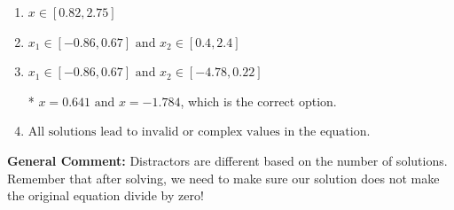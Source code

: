 \documentclass{extbook}[14pt]
\begin{document}
\begin{enumerate}
{\begin{enumerate}[label=\Alph*.]
\item \( x \in [0.82,2.75] \)


\item \( x_1 \in [-0.86, 0.67] \text{ and } x_2 \in [0.4,2.4] \)


\item \( x_1 \in [-0.86, 0.67] \text{ and } x_2 \in [-4.78,0.22] \)

* $x = 0.641 \text{ and } x = -1.784$, which is the correct option.
\item \( \text{All solutions lead to invalid or complex values in the equation.} \)


\end{enumerate}

\textbf{General Comment:} Distractors are different based on the number of solutions. Remember that after solving, we need to make sure our solution does not make the original equation divide by zero!
}
\end{enumerate}
\end{document}
